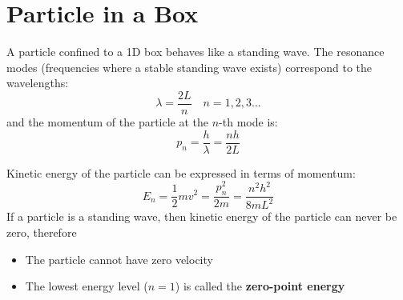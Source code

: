 \section{Particle in a Box}
%  
\begin{figure}[ht]
  \centering
\end{figure}

A particle confined to a 1D box behaves like a standing wave. The resonance
modes (frequencies where a stable standing wave exists) correspond to the
wavelengths:
\begin{equation}
  \lambda=\frac{2L}n\quad n=1,2,3\ldots
\end{equation}
and the momentum of the particle at the $n$-th mode is:
\begin{equation}
  p_n=\frac h\lambda=\frac{nh}{2L}
\end{equation}
%  
%
%
%
%

Kinetic energy of the particle can be expressed in terms of momentum:
\begin{equation}
  E_n=\frac12mv^2=\frac{p_n^2}{2m}=\frac{n^2h^2}{8mL^2}
\end{equation}
If a particle is a standing wave, then kinetic energy of the particle can
never be zero, therefore
\begin{itemize}
\item The particle cannot have zero velocity
\item The lowest energy level ($n=1$) is called the
  \textbf{zero-point energy}
    \end{itemize}


